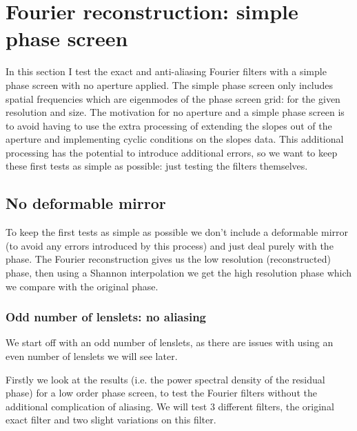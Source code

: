 \documentclass[pdf]{note}
\begin{document}
\newpage
\section{Fourier reconstruction: simple phase screen}

In this section I test the exact and anti-aliasing Fourier filters with a simple phase screen
with no aperture applied.  The simple phase screen only includes spatial frequencies which
are eigenmodes of the phase screen grid: for the given resolution and size.
The motivation for no aperture and a simple phase screen is to avoid having to use
the extra processing of extending the slopes out of the aperture and implementing
cyclic conditions on the slopes data.  This additional processing has the potential
to introduce additional errors, so we want to keep these first tests as simple as possible:
just testing the filters themselves.

\subsection{No deformable mirror}
To keep the first tests as simple as possible we don't include a deformable mirror (to
avoid any errors introduced by this process) and just deal purely with the phase.  The Fourier
reconstruction gives us the low resolution (reconstructed) phase, then using a Shannon interpolation we get
the high resolution phase which we compare with the original phase.

\subsubsection{Odd number of lenslets: no aliasing}

We start off with an odd number of lenslets, as there are issues with using an even number of
lenslets we will see later.

Firstly we look at the results (i.e. the power spectral density of the residual phase) for
a low order phase screen, to test the Fourier filters without the additional complication of
aliasing.  We will test 3 different filters, the original exact filter and two slight variations
on this filter.
\end{document}
